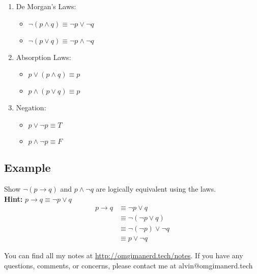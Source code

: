 \documentclass{math}
\begin{document}
\begin{enumerate}
  \item De Morgan's Laws:
  \begin{itemize}
    \item \( \neg{(p \wedge q)} \equiv \neg{p} \vee \neg{q} \)
    \item \( \neg{(p \vee q)} \equiv \neg{p} \wedge \neg{q} \)
  \end{itemize}
  \item Absorption Laws:
  \begin{itemize}
    \item \( p \vee (p \wedge q) \equiv p \)
    \item \( p \wedge (p \vee q) \equiv p \)
  \end{itemize}
  \item Negation:
  \begin{itemize}
    \item \( p \vee \neg{p} \equiv T \)
    \item \( p \wedge \neg{p} \equiv F \)
  \end{itemize}
\end{enumerate}

\subsection*{Example}
Show \( \neg{(p \to q)} \) and \( p \wedge \neg{q} \) are logically equivalent
using the laws. \\
\textbf{Hint:} \( p \to q \equiv \neg{p} \vee q \)
\begin{align*}
  p \to q &\equiv \neg{p} \vee q \\
  &\equiv \neg{(\neg{p} \vee q)} \\
  &\equiv \neg{(\neg{p})} \vee \neg{q} \\
  &\equiv p \vee \neg{q}
\end{align*}

\begin{center}
  You can find all my notes at \url{http://omgimanerd.tech/notes}. If you have
  any questions, comments, or concerns, please contact me at
  alvin@omgimanerd.tech
\end{center}
\end{document}
